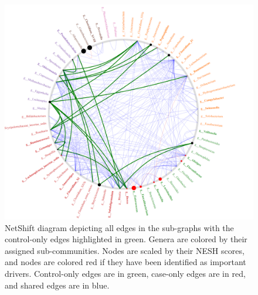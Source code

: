 \begin{figure}[htb!]
    \centering
    \includegraphics[width=1.0\linewidth]{figure/results/control_only.png}
    \caption[NetShift diagram depicting all edges in the sub-graphs with the control-only edges highlighted in green.]{NetShift diagram depicting all edges in the sub-graphs with the control-only edges highlighted in green. Genera are colored by their assigned sub-communities. Nodes are scaled by their \acrshort{NESH} scores, and nodes are colored red if they have been identified as important drivers. Control-only edges are in green, case-only edges are in red, and shared edges are in blue.}
    \label{apdx-fig-h-only-nesh}
\end{figure}

